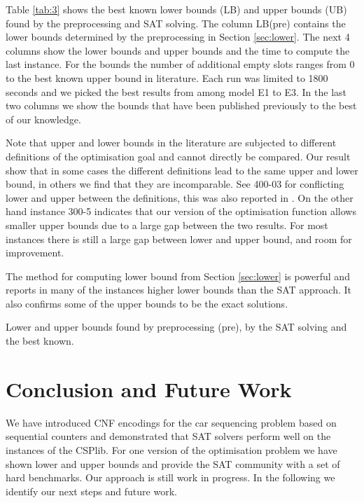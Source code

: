 \documentclass[]{llncs}
\begin{document}
Table \ref{tab:3} shows the best known lower bounds (LB) and upper bounds (UB) found by the preprocessing and SAT
solving. The column LB(pre) contains the lower bounds determined by the preprocessing in Section \ref{sec:lower}. The
next 4 columns show the lower bounds and upper bounds and the time to compute the last instance. For the bounds the
number of additional empty slots ranges from 0 to the best known upper bound in literature. Each run was limited to 1800
seconds and we picked the best results from among model E1 to E3. In the last two columns we show the bounds that have
been published previously to the best of our knowledge. 

Note that upper and lower bounds in the literature are subjected to different definitions of the optimisation goal and
cannot directly be compared. Our result show that in some cases the different definitions lead to the same upper and
lower bound, in others we find that they are incomparable. See 400-03 for conflicting lower and upper between the
definitions, this was also reported in \cite{Estellon06}. On the other hand instance 300-5 indicates that our version of
the optimisation function allows smaller upper bounds due to a large gap between the two results. For most instances
there is still a large gap between lower and upper bound, and room for improvement. 

The method for computing lower bound from Section \ref{sec:lower} is powerful and reports in many of the instances
higher lower bounds than the SAT approach. It also confirms some of the upper bounds to be the exact solutions. 

\begin{table}[htbp]
    \caption{Lower and upper bounds found by preprocessing (pre), by the SAT solving and the best known.}
    \centering
    
    \label{tab:3}
\end{table}

\section{Conclusion and Future Work}

We have introduced CNF encodings for the car sequencing problem based on sequential counters and demonstrated that SAT
solvers perform well on the instances of the CSPlib. For one version of the optimisation problem we have shown lower and
upper bounds and provide the SAT community with a set of hard benchmarks. Our approach is still work in progress. In the
following we identify our next steps and future work. 
\end{document}
